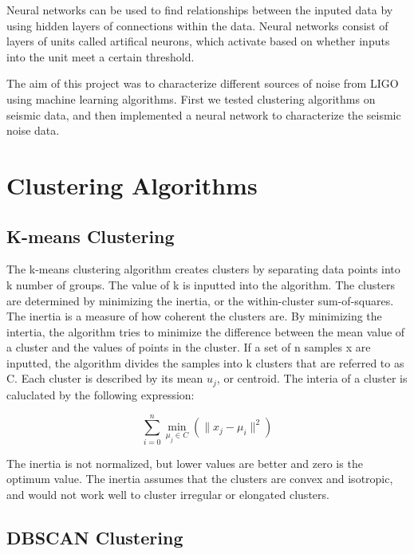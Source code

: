 \documentclass[colorlinks=true,pdfstartview=FitV,linkcolor=blue,
            citecolor=red,urlcolor=magenta]{ligodoc}
\begin{document}
\par Neural networks can be used to find relationships between the inputed data by using hidden layers of connections within the data. Neural networks consist of layers of units called artifical neurons, which activate based on whether inputs into the unit meet a certain threshold. \cite{Citation1}

\par The aim of this project was to characterize different sources of noise from LIGO using machine learning algorithms. First we tested clustering algorithms on seismic data, and then implemented a neural network to characterize the seismic noise data.

\section{Clustering Algorithms}

\subsection{K-means Clustering}

\indent

\par The k-means clustering algorithm creates clusters by separating data points into k number of groups. The value of k is inputted into the algorithm. The clusters are determined by minimizing the inertia, or the within-cluster sum-of-squares. The inertia is a measure of how coherent the clusters are. By minimizing the intertia, the algorithm tries to minimize the difference between the mean value of a cluster and the values of points in the cluster. If a set of n samples x are inputted, the algorithm divides the samples into k clusters that are referred to as  C. Each cluster is described by its mean \(u_j\), or centroid. The interia of a cluster is caluclated by the following expression:

\[\sum_{i=0}^{n} \min_{\mu_j \in  C}(\|x_j-\mu_i\|^2)\]

\par The inertia is not normalized, but lower values are better and zero is the optimum value. The inertia assumes that the clusters are convex and isotropic, and would not work well to cluster irregular or elongated clusters. \cite{Citation2}\cite{Citation3} 

\subsection{DBSCAN Clustering}
\end{document}
